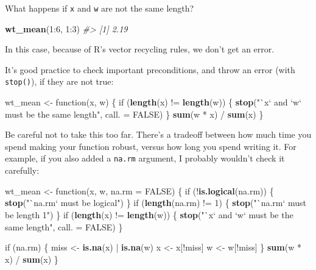 \documentclass[]{book}
\newenvironment{Shaded}{\begin{snugshade}}{\end{snugshade}}
\newcommand{\KeywordTok}[1]{\textcolor[rgb]{0.13,0.29,0.53}{\textbf{{#1}}}}
\newcommand{\DataTypeTok}[1]{\textcolor[rgb]{0.13,0.29,0.53}{{#1}}}
\newcommand{\DecValTok}[1]{\textcolor[rgb]{0.00,0.00,0.81}{{#1}}}
\newcommand{\StringTok}[1]{\textcolor[rgb]{0.31,0.60,0.02}{{#1}}}
\newcommand{\CommentTok}[1]{\textcolor[rgb]{0.56,0.35,0.01}{\textit{{#1}}}}
\newcommand{\OtherTok}[1]{\textcolor[rgb]{0.56,0.35,0.01}{{#1}}}
\newcommand{\NormalTok}[1]{{#1}}
\begin{document}
What happens if \texttt{x} and \texttt{w} are not the same length?

\begin{Shaded}
\begin{Highlighting}[]
\KeywordTok{wt_mean}\NormalTok{(}\DecValTok{1}\NormalTok{:}\DecValTok{6}\NormalTok{, }\DecValTok{1}\NormalTok{:}\DecValTok{3}\NormalTok{)}
\CommentTok{#> [1] 2.19}
\end{Highlighting}
\end{Shaded}

In this case, because of R's vector recycling rules, we don't get an
error.

It's good practice to check important preconditions, and throw an error
(with \texttt{stop()}), if they are not true:

\begin{Shaded}
\begin{Highlighting}[]
\NormalTok{wt_mean <-}\StringTok{ }\NormalTok{function(x, w) \{}
  \NormalTok{if (}\KeywordTok{length}\NormalTok{(x) !=}\StringTok{ }\KeywordTok{length}\NormalTok{(w)) \{}
    \KeywordTok{stop}\NormalTok{(}\StringTok{"`x` and `w` must be the same length"}\NormalTok{, }\DataTypeTok{call. =} \OtherTok{FALSE}\NormalTok{)}
  \NormalTok{\}}
  \KeywordTok{sum}\NormalTok{(w *}\StringTok{ }\NormalTok{x) /}\StringTok{ }\KeywordTok{sum}\NormalTok{(x)}
\NormalTok{\}}
\end{Highlighting}
\end{Shaded}

Be careful not to take this too far. There's a tradeoff between how much
time you spend making your function robust, versus how long you spend
writing it. For example, if you also added a \texttt{na.rm} argument, I
probably wouldn't check it carefully:

\begin{Shaded}
\begin{Highlighting}[]
\NormalTok{wt_mean <-}\StringTok{ }\NormalTok{function(x, w, }\DataTypeTok{na.rm =} \OtherTok{FALSE}\NormalTok{) \{}
  \NormalTok{if (!}\KeywordTok{is.logical}\NormalTok{(na.rm)) \{}
    \KeywordTok{stop}\NormalTok{(}\StringTok{"`na.rm` must be logical"}\NormalTok{)}
  \NormalTok{\}}
  \NormalTok{if (}\KeywordTok{length}\NormalTok{(na.rm) !=}\StringTok{ }\DecValTok{1}\NormalTok{) \{}
    \KeywordTok{stop}\NormalTok{(}\StringTok{"`na.rm` must be length 1"}\NormalTok{)}
  \NormalTok{\}}
  \NormalTok{if (}\KeywordTok{length}\NormalTok{(x) !=}\StringTok{ }\KeywordTok{length}\NormalTok{(w)) \{}
    \KeywordTok{stop}\NormalTok{(}\StringTok{"`x` and `w` must be the same length"}\NormalTok{, }\DataTypeTok{call. =} \OtherTok{FALSE}\NormalTok{)}
  \NormalTok{\}}
  
  \NormalTok{if (na.rm) \{}
    \NormalTok{miss <-}\StringTok{ }\KeywordTok{is.na}\NormalTok{(x) |}\StringTok{ }\KeywordTok{is.na}\NormalTok{(w)}
    \NormalTok{x <-}\StringTok{ }\NormalTok{x[!miss]}
    \NormalTok{w <-}\StringTok{ }\NormalTok{w[!miss]}
  \NormalTok{\}}
  \KeywordTok{sum}\NormalTok{(w *}\StringTok{ }\NormalTok{x) /}\StringTok{ }\KeywordTok{sum}\NormalTok{(x)}
\NormalTok{\}}
\end{Highlighting}
\end{Shaded}
\end{document}
